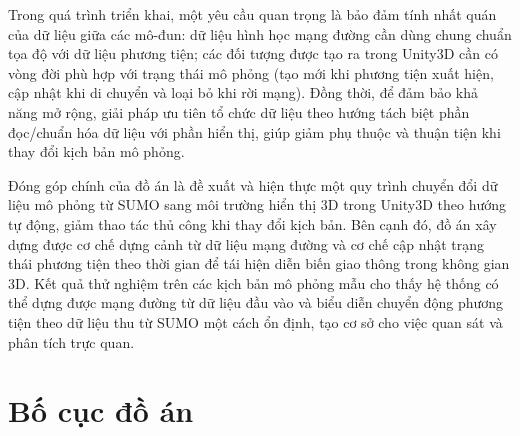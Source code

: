 \documentclass[../DoAn.tex]{subfiles}
\begin{document}
Trong quá trình triển khai, một yêu cầu quan trọng là bảo đảm tính nhất quán của dữ liệu giữa các mô-đun: dữ liệu hình học mạng đường cần dùng chung chuẩn tọa độ với dữ liệu phương tiện; các đối tượng được tạo ra trong Unity3D cần có vòng đời phù hợp với trạng thái mô phỏng (tạo mới khi phương tiện xuất hiện, cập nhật khi di chuyển và loại bỏ khi rời mạng). Đồng thời, để đảm bảo khả năng mở rộng, giải pháp ưu tiên tổ chức dữ liệu theo hướng tách biệt phần đọc/chuẩn hóa dữ liệu với phần hiển thị, giúp giảm phụ thuộc và thuận tiện khi thay đổi kịch bản mô phỏng.

Đóng góp chính của đồ án là đề xuất và hiện thực một quy trình chuyển đổi dữ liệu mô phỏng từ SUMO sang môi trường hiển thị 3D trong Unity3D theo hướng tự động, giảm thao tác thủ công khi thay đổi kịch bản. Bên cạnh đó, đồ án xây dựng được cơ chế dựng cảnh từ dữ liệu mạng đường và cơ chế cập nhật trạng thái phương tiện theo thời gian để tái hiện diễn biến giao thông trong không gian 3D. Kết quả thử nghiệm trên các kịch bản mô phỏng mẫu cho thấy hệ thống có thể dựng được mạng đường từ dữ liệu đầu vào và biểu diễn chuyển động phương tiện theo dữ liệu thu từ SUMO một cách ổn định, tạo cơ sở cho việc quan sát và phân tích trực quan.
\section{Bố cục đồ án}
\label{section:1.4}





\end{document}
